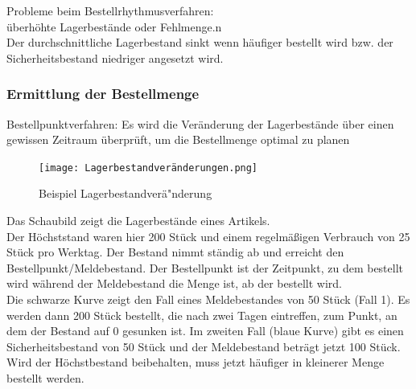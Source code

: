 \documentclass[10pt]{article}
\begin{document}
Probleme beim Bestellrhythmusverfahren: \\
überhöhte Lagerbestände oder Fehlmenge.n\\
Der durchschnittliche Lagerbestand sinkt wenn häufiger bestellt wird bzw. der Sicherheitsbestand niedriger angesetzt wird.

\subsubsection{Ermittlung der Bestellmenge}
Bestellpunktverfahren:
Es wird die Veränderung der Lagerbestände über einen gewissen Zeitraum überprüft, um die Bestellmenge optimal zu planen

\begin{figure}[H]
\begin{center}
  \texttt{[image: Lagerbestandveränderungen.png]}
  \end{center}
  \caption{Beispiel Lagerbestandver\"a"nderung}
  \label{fig:Lagerbestandveränderung}
\end{figure}

Das Schaubild zeigt die Lagerbestände eines Artikels. \\
Der Höchststand waren hier 200 Stück und einem regelmäßigen Verbrauch von 25 Stück pro Werktag. Der Bestand nimmt ständig ab und erreicht den Bestellpunkt/Meldebestand. Der Bestellpunkt ist der Zeitpunkt, zu dem bestellt wird während der Meldebestand die Menge ist, ab der  bestellt wird.\\
Die schwarze Kurve zeigt den Fall eines Meldebestandes von 50 Stück (Fall 1). Es werden dann 200 Stück bestellt, die nach zwei Tagen eintreffen, zum Punkt, an dem der Bestand auf 0 gesunken ist.
Im zweiten Fall (blaue Kurve) gibt es einen Sicherheitsbestand von 50 Stück und der Meldebestand beträgt jetzt 100 Stück. Wird der Höchstbestand beibehalten, muss jetzt häufiger in kleinerer Menge bestellt werden.
\end{document}
